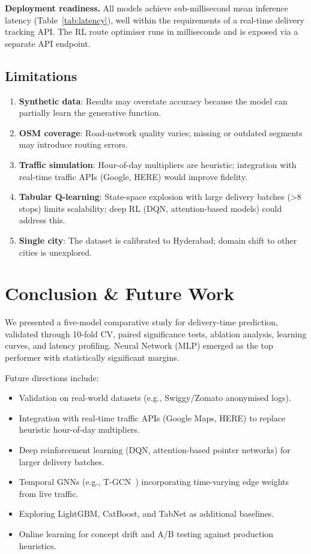 \documentclass[conference]{IEEEtran}
\begin{document}
\textbf{Deployment readiness.}  All models achieve sub-millisecond mean
inference latency (Table~\ref{tab:latency}), well within the requirements
of a real-time delivery tracking API.  The RL route optimiser runs in
milliseconds and is exposed via a separate API endpoint.

\subsection{Limitations}
\begin{enumerate}
    \item \textbf{Synthetic data}: Results may overstate accuracy because the
          model can partially learn the generative function.
    \item \textbf{OSM coverage}: Road-network quality varies; missing or
          outdated segments may introduce routing errors.
    \item \textbf{Traffic simulation}: Hour-of-day multipliers are
          heuristic; integration with real-time traffic APIs (Google, HERE)
          would improve fidelity.
    \item \textbf{Tabular Q-learning}: State-space explosion with large
          delivery batches (>8 stops) limits scalability; deep RL (DQN,
          attention-based models) could address this.
    \item \textbf{Single city}: The dataset is calibrated to Hyderabad;
          domain shift to other cities is unexplored.
\end{enumerate}

\section{Conclusion \& Future Work}
\label{sec:conclusion}

We presented a five-model comparative study for delivery-time prediction,
validated through 10-fold CV, paired significance tests, ablation analysis,
learning curves, and latency profiling.  Neural Network (MLP) emerged as the
top performer with statistically significant margins.

Future directions include:
\begin{itemize}
    \item Validation on real-world datasets (e.g., Swiggy/Zomato anonymised
          logs).
    \item Integration with real-time traffic APIs (Google Maps, HERE) to
          replace heuristic hour-of-day multipliers.
    \item Deep reinforcement learning (DQN, attention-based pointer networks)
          for larger delivery batches.
    \item Temporal GNNs (e.g., T-GCN~\cite{yu2018stgcn}) incorporating
          time-varying edge weights from live traffic.
    \item Exploring LightGBM, CatBoost, and TabNet as additional baselines.
    \item Online learning for concept drift and A/B testing against
          production heuristics.
\end{itemize}
\end{document}
